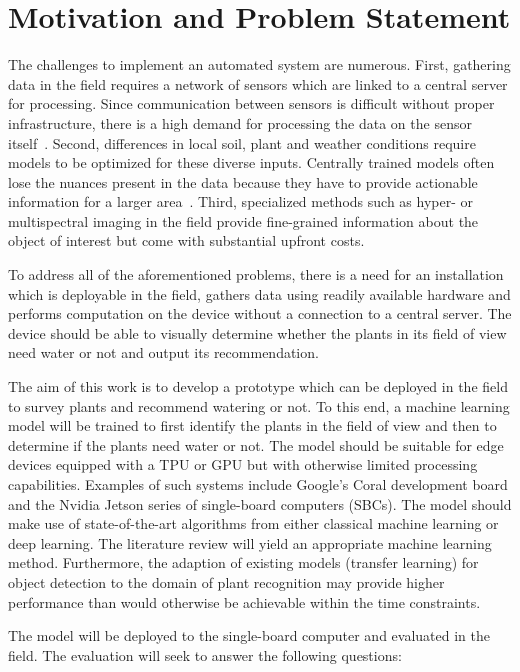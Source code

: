 \documentclass[draft,final]{vutinfth} %
\begin{document}
\section{Motivation and Problem Statement}
\label{sec:motivation}

The challenges to implement an automated system are numerous. First,
gathering data in the field requires a network of sensors which are
linked to a central server for processing. Since communication between
sensors is difficult without proper infrastructure, there is a high
demand for processing the data on the sensor
itself~\cite{mcenroe2022}. Second, differences in local soil, plant
and weather conditions require models to be optimized for these
diverse inputs. Centrally trained models often lose the nuances
present in the data because they have to provide actionable
information for a larger area~\cite{awad2019}. Third, specialized
methods such as hyper- or multispectral imaging in the field provide
fine-grained information about the object of interest but come with
substantial upfront costs.

To address all of the aforementioned problems, there is a need for an
installation which is deployable in the field, gathers data using
readily available hardware and performs computation on the device
without a connection to a central server. The device should be able to
visually determine whether the plants in its field of view need water
or not and output its recommendation.

The aim of this work is to develop a prototype which can be deployed
in the field to survey plants and recommend watering or not. To this
end, a machine learning model will be trained to first identify the
plants in the field of view and then to determine if the plants need
water or not. The model should be suitable for edge devices equipped
with a TPU or GPU but with otherwise limited processing
capabilities. Examples of such systems include Google's Coral
development board and the Nvidia Jetson series of single-board
computers (SBCs). The model should make use of state-of-the-art
algorithms from either classical machine learning or deep
learning. The literature review will yield an appropriate machine
learning method. Furthermore, the adaption of existing models
(transfer learning) for object detection to the domain of plant
recognition may provide higher performance than would otherwise be
achievable within the time constraints.

The model will be deployed to the single-board computer and evaluated
in the field. The evaluation will seek to answer the following
questions:
\end{document}
